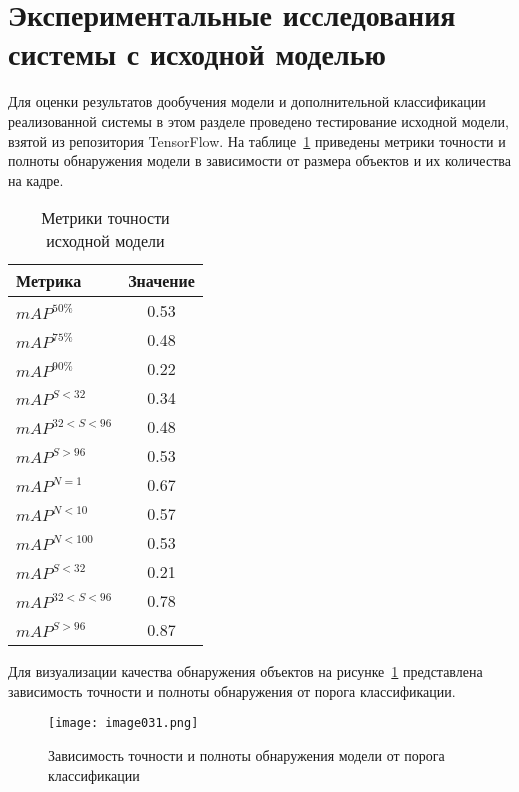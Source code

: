 \section{Экспериментальные исследования системы с исходной моделью}

Для оценки результатов дообучения модели и дополнительной классификации реализованной системы в этом разделе проведено тестирование исходной модели, взятой из репозитория TensorFlow. На таблице~\ref{tabular:tab_exp_1} приведены метрики точности и полноты обнаружения модели в зависимости от размера объектов и их количества на кадре.

\begin{table}[H]
	\def\arraystretch{1.3}
	\caption{Метрики точности исходной модели}
	\begin{center}
		\begin{tabular}{|l|c|}
			\hline
			Метрика & Значение\\  \hline			
			\(mAP^{50\%}\) & 0.53\\ \hline			
			\(mAP^{75\%}\) & 0.48\\ \hline
			\(mAP^{90\%}\) & 0.22\\ \hline
			\(mAP^{S<32}\) & 0.34\\ \hline
			\(mAP^{32<S<96}\) & 0.48\\ \hline
			\(mAP^{S>96}\) & 0.53\\ \hline
			\(mAP^{N=1}\) & 0.67\\ \hline
			\(mAP^{N<10}\) & 0.57\\ \hline
			\(mAP^{N<100}\) & 0.53\\ \hline
			\(mAP^{S<32}\) & 0.21\\ \hline
			\(mAP^{32<S<96}\) & 0.78\\ \hline
			\(mAP^{S>96}\) & 0.87\\ \hline			
		\end{tabular}
		\label{tabular:tab_exp_1}
	\end{center}
\end{table}

Для визуализации качества обнаружения объектов на рисунке~\ref{fig:image031} представлена зависимость точности и полноты обнаружения от порога классификации.

\begin{figure}[htbp]
\centering
\texttt{[image: image031.png]}
\caption{Зависимость точности и полноты обнаружения модели от порога классификации}%
\label{fig:image031}
\end{figure}

